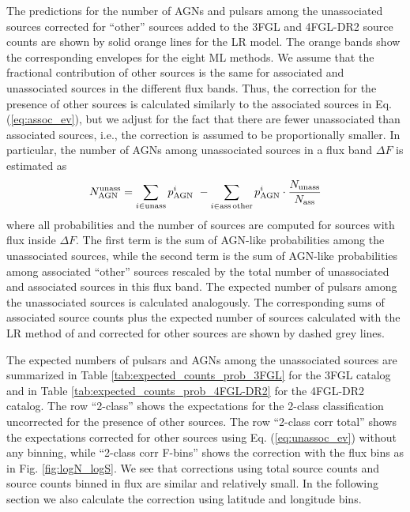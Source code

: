 \documentclass{aa}
\newcommand{\bea}{\begin{eqnarray}}
\newcommand{\eea}{\end{eqnarray}}
\newcommand{\lb}{\label}
\begin{document}
The predictions for the number of AGNs and pulsars among the unassociated sources corrected for ``other'' sources 
added to the 3FGL and 4FGL-DR2  source counts are shown by solid orange lines for the LR model.
The orange bands show the corresponding envelopes for the eight ML methods.
We assume that the fractional contribution of other sources is the same for associated and unassociated sources in the different flux bands.
Thus, the correction for the presence of other sources is calculated similarly to the associated sources in Eq. (\ref{eq:assoc_ev}),
but we adjust for the fact that there are fewer unassociated than associated sources, i.e., 
the correction is assumed to be proportionally smaller.
In particular, the number of AGNs among unassociated sources in a flux band $\Delta F$ is estimated as
\bea
\lb{eq:unassoc_ev}
N_{\rm AGN}^{\rm unass} = \sum_{i \in \rm unass} p^i_{\rm AGN}\,\, - \sum_{i \in \rm ass\,other} p^i_{\rm AGN} \cdot 
\frac{N_{\rm unass}}{N_{\rm ass}}
\eea
where all probabilities and the number of sources are computed for sources with flux inside $\Delta F$.
The first term is the sum of AGN-like probabilities among the unassociated sources,
while the second term is the sum of AGN-like probabilities among associated ``other'' sources rescaled by the total number
of unassociated and associated sources in this flux band.
The expected number of pulsars among the unassociated sources is calculated analogously.
The corresponding sums of associated source counts plus the expected number of sources calculated with the LR method of \cite{2016ApJ...820....8S} 
and corrected for other sources are shown by dashed grey lines.


The expected numbers of pulsars and AGNs among the unassociated sources
are summarized in Table \ref{tab:expected_counts_prob_3FGL} for the 3FGL catalog and 
in Table \ref{tab:expected_counts_prob_4FGL-DR2} for the 4FGL-DR2 catalog.
The row ``2-class'' shows the expectations for the 2-class classification uncorrected for the presence of other sources.
The row ``2-class corr total'' shows the expectations corrected for other sources using Eq. (\ref{eq:unassoc_ev}) without any binning,
while ``2-class corr F-bins'' shows the correction with the flux bins as in Fig. \ref{fig:logN_logS}.
We see that corrections using total source counts and source counts binned in flux are similar and relatively small.
In the following section we also calculate the correction using latitude and longitude bins.
\end{document}
